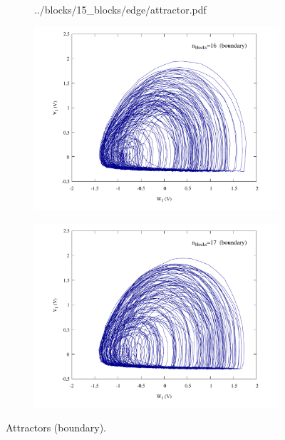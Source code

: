 \begin{figure}
\begin{minipage}{.47\textwidth}
\begin{subfigure}{\linewidth}
            {../blocks/15_blocks/edge/attractor.pdf}
        \end{subfigure}
    \end{minipage}
    \begin{minipage}{.47\textwidth}
        \begin{subfigure}{\linewidth}
            \centering
            \includegraphics[width=\linewidth]
            {../blocks/16_blocks/attractor.pdf}
        \end{subfigure}
    \end{minipage}
    \begin{minipage}{.47\textwidth}
        \begin{subfigure}{\linewidth}
            \centering
            \includegraphics[width=\linewidth]
            {../blocks/17_blocks/edge/attractor.pdf}
        \end{subfigure}
    \end{minipage}
    \caption{Attractors (boundary).}
    \label{fig:attractors 10-17}
\end{figure}


